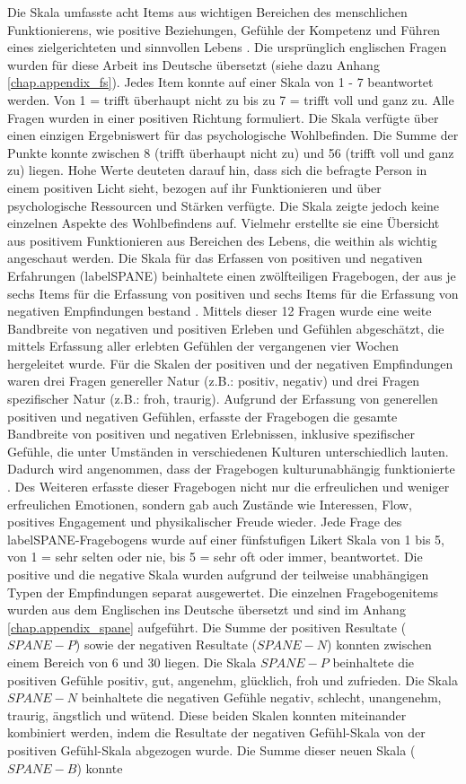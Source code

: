 Die Skala umfasste acht Items aus wichtigen Bereichen des menschlichen Funktionierens, wie positive Beziehungen, Gefühle der Kompetenz und Führen eines zielgerichteten und sinnvollen Lebens \cite{Diener:2010}. Die ursprünglich englischen Fragen wurden für diese Arbeit ins Deutsche übersetzt (siehe dazu Anhang \ref{chap.appendix_fs}). Jedes Item konnte auf einer Skala von 1 - 7 beantwortet werden. Von 1 = trifft überhaupt nicht zu bis zu 7 = trifft voll und ganz zu. Alle Fragen wurden in einer positiven Richtung formuliert. Die Skala verfügte über einen einzigen Ergebniswert für das psychologische Wohlbefinden. Die Summe der Punkte konnte zwischen 8 (trifft überhaupt nicht zu) und 56 (trifft voll und ganz zu) liegen. Hohe Werte deuteten darauf hin, dass sich die befragte Person in einem positiven Licht sieht, bezogen auf ihr Funktionieren und über psychologische Ressourcen und Stärken verfügte. Die Skala zeigte jedoch keine einzelnen Aspekte des Wohlbefindens auf. Vielmehr erstellte sie eine Übersicht aus positivem Funktionieren aus Bereichen des Lebens, die weithin als wichtig angeschaut werden. Die Skala für das Erfassen von positiven und negativen Erfahrungen (\gls{labelSPANE}) beinhaltete einen zwölfteiligen Fragebogen, der aus je sechs Items für die Erfassung von positiven und sechs Items für die Erfassung von negativen Empfindungen bestand \cite{Diener:2010}. Mittels dieser 12 Fragen wurde eine weite Bandbreite von negativen und positiven Erleben und Gefühlen abgeschätzt, die mittels Erfassung aller erlebten Gefühlen der vergangenen vier Wochen hergeleitet wurde. Für die Skalen der positiven und der negativen Empfindungen waren drei Fragen genereller Natur (z.B.: positiv, negativ) und drei Fragen spezifischer Natur (z.B.: froh, traurig). Aufgrund der Erfassung von generellen positiven und negativen Gefühlen, erfasste der Fragebogen die gesamte Bandbreite von positiven und negativen Erlebnissen, inklusive spezifischer Gefühle, die unter Umständen in verschiedenen Kulturen unterschiedlich lauten. Dadurch wird angenommen, dass der Fragebogen kulturunabhängig funktionierte \cite{Silva2013}. Des Weiteren erfasste dieser Fragebogen nicht nur die erfreulichen und weniger erfreulichen Emotionen, sondern gab auch Zustände wie Interessen, Flow, positives Engagement und physikalischer Freude wieder. Jede Frage des \gls{labelSPANE}-Fragebogens wurde auf einer fünfstufigen Likert Skala von 1 bis 5, von 1 = sehr selten oder nie, bis 5 = sehr oft oder immer, beantwortet. Die positive und die negative Skala wurden aufgrund der teilweise unabhängigen Typen der Empfindungen separat ausgewertet. Die einzelnen Fragebogenitems wurden aus dem Englischen ins Deutsche übersetzt und sind im Anhang \ref{chap.appendix_spane} aufgeführt. Die Summe der positiven Resultate ($SPANE-P$) sowie der negativen Resultate ($SPANE-N$) konnten zwischen einem Bereich von 6 und 30 liegen. Die Skala $SPANE-P$ beinhaltete die positiven Gefühle positiv, gut, angenehm, glücklich, froh und zufrieden. Die Skala $SPANE-N$ beinhaltete die negativen Gefühle negativ, schlecht, unangenehm, traurig, ängstlich und wütend. Diese beiden Skalen konnten miteinander kombiniert werden, indem die Resultate der negativen Gefühl-Skala von der positiven Gefühl-Skala abgezogen wurde. Die Summe dieser neuen Skala ($SPANE-B$) konnte 